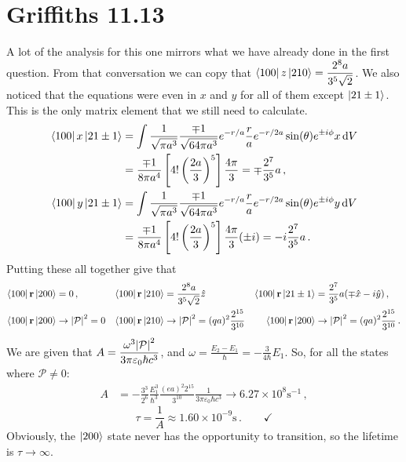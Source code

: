 \documentclass[11pt]{article}
\begin{document}
\newpage

\section*{Griffiths 11.13}
A lot of the analysis for this one mirrors what we have already done in the first question. From that conversation we can copy that $\displaystyle{\bra{1 0 0 } z \ket{2 1 0} = \frac{2^8 a}{3^5 \sqrt{2}}}$. We also noticed that the equations were even in $x$ and $y$ for all of them except $\ket{2 1 \pm 1}$. This is the only matrix element that we still need to calculate.
\begin{align*}
\bra{1 0 0} x \ket{2 1 \pm 1} & = \int \frac{1}{\sqrt{\pi a^3}}\frac{\mp 1}{\sqrt{64\pi a^3}}e^{-r/a}\frac{r}{a}e^{-r/2a}\sin(\theta)e^{\pm i \phi} x\dd{V}\\
& = \frac{\mp 1}{8\pi a^4}\left[4!\left(\frac{2a}{3}\right)^5\right]\frac{4\pi}{3} = \mp \frac{2^7}{3^5}a \, ,\\
\bra{1 0 0} y \ket{2 1 \pm 1} & = \int \frac{1}{\sqrt{\pi a^3}}\frac{\mp 1}{\sqrt{64\pi a^3}}e^{-r/a}\frac{r}{a}e^{-r/2a}\sin(\theta)e^{\pm i \phi} y\dd{V}\\
& = \frac{\mp 1}{8\pi a^4}\left[4!\left(\frac{2a}{3}\right)^5\right]\frac{4\pi}{3}(\pm i) = -i \frac{2^7}{3^5}a \, .
\end{align*}
Putting these all together give that 
\begin{align*}
\bra{1 0 0}\vb{r}\ket{2 0 0} & = 0 \, , & \bra{1 0 0}\vb{r}\ket{2 1 0} & =\frac{2^8 a}{3^5 \sqrt{2}}\hat{z} & \bra{1 0 0}\vb{r}\ket{2 1 \pm 1} & = \frac{2^7}{3^5}a(\mp \hat{x} - i \hat{y}) \, , \\
\bra{1 0 0}\vb{r}\ket{2 0 0} & \rightarrow \abs{\mathcal{P}}^2 = 0 & \bra{1 0 0}\vb{r}\ket{2 1 0} & \rightarrow \abs{\mathcal{P}}^2 = (qa)^2\frac{2^{15}}{3^{10}}  & \bra{1 0 0}\vb{r}\ket{2 0 0} & \rightarrow \abs{\mathcal{P}}^2 = (qa)^2\frac{2^{15}}{3^{10}} \, .
\end{align*}
We are given that $\displaystyle{A = \frac{\omega^3 \abs{\mathcal{P}}^2}{3\pi \varepsilon_0 \hbar c^3}}$, and $\displaystyle{\omega = \frac{E_2-E_1}{\hbar} = -\frac{3}{4\hbar}E_1}$. So, for all the states where $\mathcal{P}\neq 0$:
\begin{align*}
A & = -\frac{3^3}{2^6}\frac{E_1^3}{\hbar^3}\frac{(ea)^2 2^{15}}{3^{10}}\frac{1}{3\pi\varepsilon_0 \hbar c^3} \rightarrow 6.27\times 10^8 \text{s}^{-1} \, ,
\end{align*}
\[\boxed{\tau = \frac{1}{A} \approx 1.60\times 10^{-9} \text{s}} \, .\qquad \checkmark\]
Obviously, the $\ket{2 0 0 }$ state never has the opportunity to transition, so the lifetime is $\tau \rightarrow \infty$. 
\end{document}

